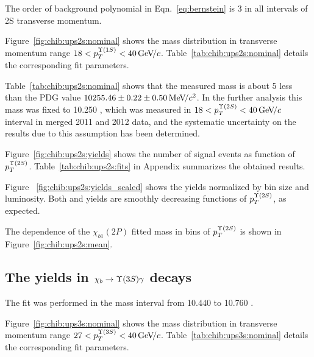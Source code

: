  The order of background polynomial in Eqn.~\ref{eq:bernstein} is 3 in all
 intervals of \Y2S transverse momentum.


Figure~\ref{fig:chib:ups2s:nominal} shows the mass distribution in transverse
momentum range $18 < p_T^{\OneS} < 40 \gevc$. Table~\ref{tab:chib:ups2s:nominal}
details the corresponding fit parameters.




Table~\ref{tab:chib:ups2s:nominal} shows that the measured \chiboneTwoP mass is
about 5 \mevcc less than the PDG value $10255.46  \pm 0.22 \pm 0.50 {\mathrm{\,Me\kern -0.1em V\!/}c^2}$. In
the further analysis this mass was fixed to 10.250 \gevcc, which was measured
in $18 < p_T^{\Y2S} < 40 \gevc$ interval in merged 2011 and 2012 data, and the
systematic uncertainty on the results due to this assumption has been
determined.





Figure~\ref{fig:chib:ups2s:yields} shows the number of signal events as function
of $p_T^{\Y2S}$. Table~\ref{tab:chib:ups2s:fits} in Appendix summarizes the
obtained results.



Figure ~\ref{fig:chib:ups2s:yields_scaled} shows the yields normalized by bin
size and luminosity. Both \chibTwoP and \chibThreeP yields are smoothly
decreasing functions of $p_T^{\Y2S}$, as expected.

The dependence of the $\chi_{b1}(2P)$ fitted mass in bins of $p_T^{\Y2S}$ is
shown in Figure~\ref{fig:chib:ups2s:mean}.


\subsection{The \texorpdfstring{\chib}{chib} yields in
	\texorpdfstring{$\chib \to \Y3S \gamma$}{chib --> Y(3S) gamma} decays}
\label{sec:chib:ups3s:fit}

The fit was performed in the mass interval from  10.440 to 10.760 \gevcc. 

Figure~\ref{fig:chib:ups3s:nominal} shows the mass distribution in transverse
momentum range $27<p_T^{\Y3S}<40\gevc$. Table~\ref{tab:chib:ups3s:nominal}
details the corresponding fit parameters.




